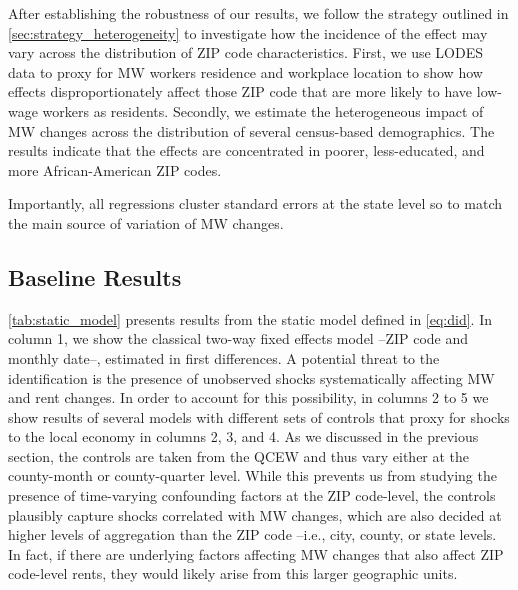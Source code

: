 
After establishing the robustness of our results, we follow the strategy outlined in 
\autoref{sec:strategy_heterogeneity} to investigate how the incidence of the effect may vary 
across the distribution of ZIP code characteristics. First, we use LODES data to proxy for MW 
workers residence and workplace location to show how effects disproportionately affect those 
ZIP code that are more likely to have low-wage workers as residents. Secondly, we estimate the 
heterogeneous impact of MW changes across the distribution of several census-based 
demographics. The results indicate that the effects are concentrated in poorer, less-educated, 
and more African-American ZIP codes. 

Importantly, all regressions cluster standard errors at the state level so to match the main 
source of variation of MW changes.

\subsection{Baseline Results}\label{sec:baseline_results}

\autoref{tab:static_model} presents results from the static model defined in \autoref{eq:did}. In 
column 1, we show the classical two-way fixed effects model --ZIP code and monthly date--, 
estimated in first differences. A potential threat to the identification is the presence of 
unobserved shocks systematically affecting MW and rent changes. In order to account for this 
possibility, in columns 2 to 5 we show results of several models with different sets of controls 
that proxy for shocks to the local economy in columns 2, 3, and 4. As we discussed in the previous 
section, the controls are taken from the QCEW and thus vary either at the county-month or 
county-quarter level. While this prevents us from studying the presence of time-varying 
confounding factors at the ZIP code-level, the controls plausibly capture shocks correlated with 
MW changes, which are also decided at higher levels of aggregation than the ZIP code --i.e., city, 
county, or state levels. In fact, if there are underlying factors affecting MW changes that also 
affect ZIP code-level rents, they would likely arise from this larger geographic units. 

